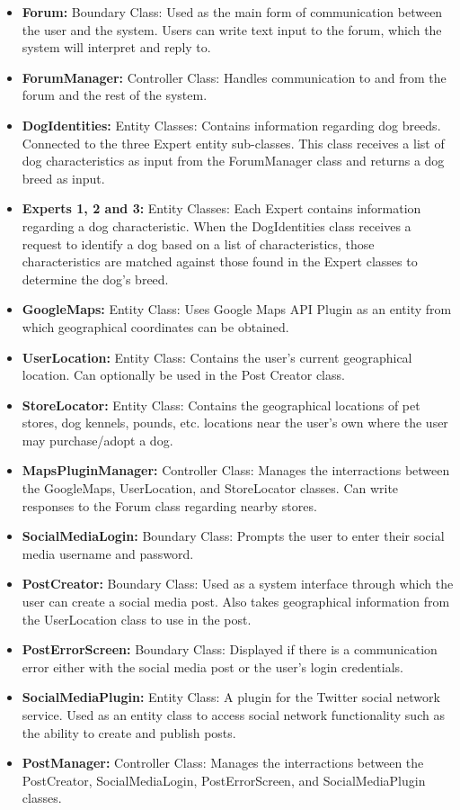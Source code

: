 \documentclass[]{article}
\begin{document}
\begin{itemize}
\item \textbf{Forum:} Boundary Class: Used as the main form of communication between the user and the system. Users can write text input to the forum, which the system will interpret and reply to.
\item \textbf{ForumManager:} Controller Class: Handles communication to and from the forum and the rest of the system.
\item \textbf{DogIdentities:} Entity Classes: Contains information regarding dog breeds. Connected to the three Expert entity sub-classes. This class receives a list of dog characteristics as input from the ForumManager class and returns a dog breed as input.
\item \textbf{Experts 1, 2 and 3:} Entity Classes: Each Expert contains information regarding a dog characteristic. When the DogIdentities class receives a request to identify a dog based on a list of characteristics, those characteristics are matched against those found in the Expert classes to determine the dog's breed.
\item \textbf{GoogleMaps:} Entity Class: Uses Google  Maps API Plugin as an entity from which geographical coordinates can be obtained.
\item \textbf{UserLocation:} Entity Class: Contains the user's current geographical location. Can optionally be used in the Post Creator class.
\item \textbf{StoreLocator:} Entity Class: Contains the geographical locations of pet stores, dog kennels, pounds, etc. locations near the user's own where the user may purchase/adopt a dog.
\item \textbf{MapsPluginManager:} Controller Class: Manages the interractions between the GoogleMaps, UserLocation, and StoreLocator classes. Can write responses to the Forum class regarding nearby stores.
\item \textbf{SocialMediaLogin:} Boundary Class: Prompts the user to enter their social media username and password.
\item \textbf{PostCreator:} Boundary Class: Used as a system interface through which the user can create a social media post. Also takes geographical information from the UserLocation class to use in the post.
\item \textbf{PostErrorScreen:} Boundary Class: Displayed if there is a communication error either with the social media post or the user's login credentials.
\item \textbf{SocialMediaPlugin:} Entity Class: A plugin for the Twitter social network service. Used as an entity class to access social network functionality such as the ability to create and publish posts.
\item \textbf{PostManager:} Controller Class: Manages the interractions between the PostCreator, SocialMediaLogin, PostErrorScreen, and SocialMediaPlugin classes.
\end{itemize}
\end{document}
